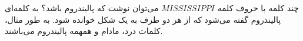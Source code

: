 \p
چند کلمه با حروف کلمه
$MISSISSIPPI$
می‌توان نوشت که 
پالیندروم
باشد؟
 به کلمه‌ای پالیندروم گفته می‌شود که از هر دو طرف به یک شکل خوانده شود. به طور مثال، کلمات درد، مادام و همهمه پالیندروم می‌باشند.